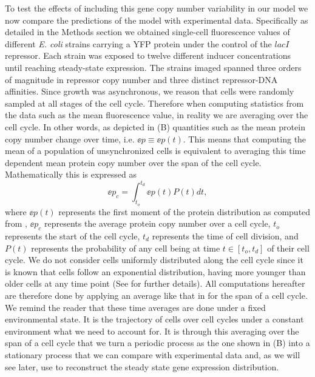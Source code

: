 To test the effects of including this gene copy number variability in our model
we now compare the predictions of the model with experimental data.
Specifically as detailed in the Methods section we obtained single-cell
fluorescence values of different {\it E. coli} strains carrying a YFP protein
under the control of the $lacI$ repressor. Each strain was exposed to twelve
different inducer concentrations until reaching steady-state expression. The
strains imaged spanned three orders of magnitude in repressor copy number and
three distinct repressor-DNA affinities. Since growth was asynchronous, we
reason that cells were randomly sampled at all stages of the cell cycle.
Therefore when computing statistics from the data such as the mean fluorescence
value, in reality we are averaging over the cell cycle. In other words, as
depicted in (B) quantities such as the mean protein copy
number change over time, i.e. $\ee{p} \equiv \ee{p(t)}$. This means that
computing the mean of a population of unsynchronized cells is equivalent to
averaging this time dependent mean protein copy number over the span of the
cell cycle. Mathematically this is expressed as
\begin{equation}
	\ee{p}_c = \int_{t_o}^{t_d} \ee{p(t)} P(t) dt,
	\label{eq_time_avg}
\end{equation}
where $\ee{p(t)}$ represents the first moment of the protein distribution as
computed from , $\ee{p}_c$ represents the average protein
copy number over a cell cycle, $t_o$ represents the start of the cell cycle,
$t_d$ represents the time of cell division, and $P(t)$ represents the
probability of any cell being at time $t \in [t_o, t_d]$ of their cell cycle.
We do not consider cells uniformly distributed along the cell cycle since it is
known that cells follow an exponential distribution, having more younger than
older cells at any time point \cite{Powell1956} (See 
for further details). All computations hereafter are therefore done by applying
an average like that in  for the span of a cell cycle. We
remind the reader that these time averages are done under a fixed environmental
state. It is the trajectory of cells over cell cycles under a constant
environment what we need to account for. It is through this averaging over the
span of a cell cycle that we turn a periodic process as the one shown in
(B) into a stationary process that we can compare with
experimental data and, as we will see later, use to reconstruct the steady
state gene expression distribution.

